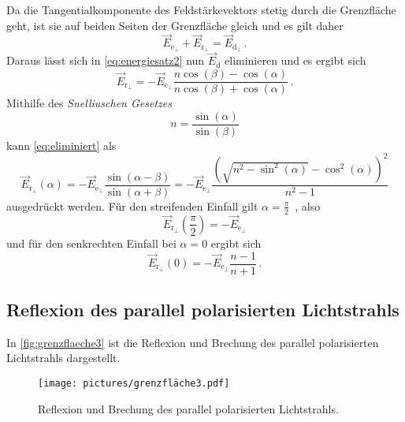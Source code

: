 Da die Tangentialkomponente des Feldstärkevektors stetig durch die Grenzfläche geht,
ist sie auf beiden Seiten der Grenzfläche gleich und es gilt daher
\begin{equation}
    \vec{E}_{\mathrm{e}_{\perp}}+\vec{E}_{\mathrm{r}_{\perp}}=\vec{E}_{\mathrm{d}_{\perp}} \, .
\end{equation}
Daraus lässt sich in \autoref{eq:energiesatz2} nun $\vec{E}_\text{d}$ eliminieren und es ergibt sich
\begin{equation} \label{eq:eliminiert}
    \vec{E}_{\mathrm{r}_{\perp}}=-\vec{E}_{\mathrm{e}_{\perp}} \frac{n \cos (\beta)-\cos (\alpha)}{n \cos (\beta)+\cos (\alpha)} \, .
\end{equation}
Mithilfe des \textit{Snelliuschen Gesetzes}
\begin{equation} \label{eq:snellius}
    n=\frac{\sin (\alpha)}{\sin (\beta)}
\end{equation}
kann \autoref{eq:eliminiert} als
\begin{equation} \label{eq:r_senkrecht}
    \vec{E}_{\mathrm{r}_{\perp}}(\alpha) 
    = -\vec{E}_{\mathrm{e}_{\perp}} \frac{\sin (\alpha-\beta)}{\sin (\alpha+\beta)}
    = -\vec{E}_{\mathrm{e}_{\perp}} \frac{\left(\sqrt{n^{2}-\sin ^{2}(\alpha)}-\cos ^{2}(\alpha)\right)^{2}}{n^{2}-1}
\end{equation}
ausgedrückt werden. Für den streifenden Einfall gilt $\alpha = \frac{\pi}{2} \,$ , also 
\begin{equation*}
    \vec{E}_{\mathrm{r}_{\perp}}\left(\frac{\pi}{2}\right)=-\vec{E}_{\mathrm{e}_{\perp}}
\end{equation*}
und für den senkrechten Einfall bei $\alpha = 0$ ergibt sich
\begin{equation*}
    \vec{E}_{\mathrm{r}_{\perp}}(0)=-\vec{E}_{\mathrm{e}_{\perp}} \frac{n-1}{n+1} \, .
\end{equation*}


\subsection{Reflexion des parallel polarisierten Lichtstrahls}

In \autoref{fig:grenzflaeche3} ist die Reflexion und Brechung des parallel polarisierten Lichtstrahls dargestellt.
\begin{figure}[ht]
    \centering
    \texttt{[image: pictures/grenzfläche3.pdf]}
    \caption{Reflexion und Brechung des parallel polarisierten Lichtstrahls. \cite{v407}}
    \label{fig:grenzflaeche3}
\end{figure}

